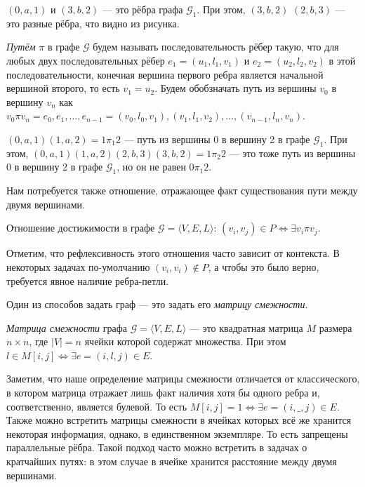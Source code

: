 \begin{example}
$(0,a,1)$  и $(3,b,2)$ --- это рёбра графа $\mathcal{G}_1$.%
При этом, $(3,b,2)$ $(2,b,3)$ --- это разные рёбра, что видно из рисунка.
\end{example}

\begin{definition}
  \textit{Путём} $\pi$ в графе $\mathcal{G}$ будем называть последовательность рёбер такую, что для любых двух последовательных рёбер $e_1=(u_1,l_1,v_1)$ и $e_2=(u_2,l_2,v_2)$ в этой последовательности, конечная вершина первого ребра является начальной вершиной второго, то есть $v_1 = u_2$.
  Будем обобзначать путь из вершины $v_0$ в вершину $v_n$ как $v_0 \pi v_n = e_0,e_1, \dots, e_{n-1} = (v_0, l_0, v_1),(v_1,l_1,v_2),\dots,(v_{n-1},l_n,v_n)$.
\end{definition}


\begin{example}
$(0,a,1)(1,a,2) = 1\pi_1 2$  --- путь из вершины 0 в вершину 2 в графе $\mathcal{G}_1$.
При этом, $(0,a,1)(1,a,2)(2,b,3)(3,b,2) = 1\pi_2 2$ --- это тоже путь из вершины 0 в вершину 2 в графе $\mathcal{G}_1$, но он не равен $0\pi_1 2$.
\end{example}


Нам потребуется также отношение, отражающее факт существования пути между двумя вершинами.

\begin{definition}\label{def:reach}
  Отношение достижимости в графе $\mathcal{G} = \langle V, E, L \rangle$: $(v_i,v_j) \in P \iff \exists v_i \pi v_j$.
\end{definition}

Отметим, что рефлексивность этого отношения часто зависит от контекста.
В некоторых задачах по-умолчанию $(v_i,v_i) \notin P$, а чтобы это было верно, требуется явное наличие ребра-петли.

Один из способов задать граф --- это задать его \textit{матрицу смежности}.

\begin{definition}
  \textit{Матрица смежности} графа $\mathcal{G}=\langle V,E,L \rangle$ --- это квадратная матрица $M$ размера $n \times n$, где $|V| = n$ ячейки которой содержат множества.
  При этом $l \in M[i,j] \iff \exists e = (i,l,j) \in E$.
\end{definition}

Заметим, что наше определение матрицы смежности отличается от классического, в котором матрица отражает лишь факт наличия хотя бы одного ребра и, соответственно, является булевой.
То есть $M[i,j] = 1 \iff \exists e = (i,\_,j) \in E$.
Также можно встретить матрицы смежности в ячейках которых всё же хранится некоторая информация, однако, в единственном экземпляре.
То есть запрещены параллельные рёбра.
Такой подход часто можно встретить в задачах о кратчайших путях: в этом случае в ячейке хранится расстояние между двумя вершинами.

